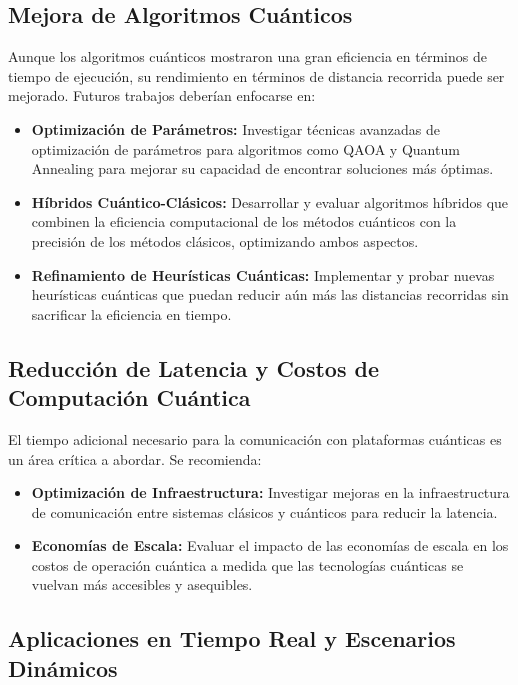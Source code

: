 \documentclass[11pt,a4paper,spanish]{book}
\begin{document}
\subsection{Mejora de Algoritmos Cuánticos}

Aunque los algoritmos cuánticos mostraron una gran eficiencia en términos de tiempo de ejecución, su rendimiento en términos de distancia recorrida puede ser mejorado. Futuros trabajos deberían enfocarse en:

\begin{itemize}
    \item \textbf{Optimización de Parámetros:} Investigar técnicas avanzadas de optimización de parámetros para algoritmos como QAOA y Quantum Annealing para mejorar su capacidad de encontrar soluciones más óptimas.
    \item \textbf{Híbridos Cuántico-Clásicos:} Desarrollar y evaluar algoritmos híbridos que combinen la eficiencia computacional de los métodos cuánticos con la precisión de los métodos clásicos, optimizando ambos aspectos.
    \item \textbf{Refinamiento de Heurísticas Cuánticas:} Implementar y probar nuevas heurísticas cuánticas que puedan reducir aún más las distancias recorridas sin sacrificar la eficiencia en tiempo.
\end{itemize}

\subsection{Reducción de Latencia y Costos de Computación Cuántica}

El tiempo adicional necesario para la comunicación con plataformas cuánticas es un área crítica a abordar. Se recomienda:

\begin{itemize}
    \item \textbf{Optimización de Infraestructura:} Investigar mejoras en la infraestructura de comunicación entre sistemas clásicos y cuánticos para reducir la latencia.
    \item \textbf{Economías de Escala:} Evaluar el impacto de las economías de escala en los costos de operación cuántica a medida que las tecnologías cuánticas se vuelvan más accesibles y asequibles.
\end{itemize}

\subsection{Aplicaciones en Tiempo Real y Escenarios Dinámicos}
\end{document}
